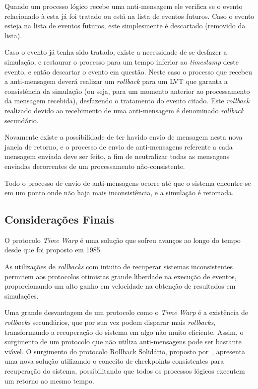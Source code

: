 Quando um processo lógico recebe uma anti-mensagem ele verifica se o evento relacionado à esta já foi tratado ou está na lista de eventos futuros. Caso o evento esteja na lista de eventos futuros, este simplesmente é descartado (removido da lista).

Caso o evento já tenha sido tratado, existe a necessidade de se desfazer a simulação, e restaurar o processo para um tempo inferior ao \textit{timestamp} deste evento, e então descartar o evento em questão. Neste caso o processo que recebeu a anti-mensagem deverá realizar um \textit{rollback} para um LVT que garanta a consistência da simulação (ou seja, para um momento anterior ao processamento da mensagem recebida), desfazendo o tratamento do evento citado. Este \textit{rollback} realizado devido ao recebimento de uma anti-mensagem é denominado \textit{rollback} secundário.

Novamente existe a possibilidade de ter havido envio de mensagem nesta nova janela de retorno, e o processo de envio de anti-mensagens referente a cada mensagem enviada deve ser feito, a fim de neutralizar todas as mensagens enviadas decorrentes de um processamento não-consistente.

Todo o processo de envio de anti-mensagens ocorre até que o sistema encontre-se em um ponto onde não haja mais inconsistência, e a simulação é retomada.

\subsection{Considerações Finais}

O protocolo \textit{Time Warp} é uma solução que sofreu avanços ao longo do tempo desde que foi proposto em 1985. 

As utilizações de \textit{rollbacks} com intuito de recuperar sistemas inconsistentes permitem aos protocolos otimistas grande liberdade na execução de eventos, proporcionando um alto ganho em velocidade na obtenção de resultados em simulações. 

Uma grande desvantagem de um protocolo como o \textit{Time Warp} é a existência de \textit{rollbacks} secundários, que por sua vez podem disparar mais \textit{rollbacks}, transformando a recuperação do sistema em algo não muito eficiente. Assim, o surgimento de um protocolo que não utiliza anti-mensagens pode ser bastante viável. O surgimento do protocolo Rollback Solidário, proposto por~\cite{EDMARMO}, apresenta uma nova solução utilizando o conceito de checkpoints consistentes para recuperação do sistema, possibilitando que todos os processos lógicos executem um retorno ao mesmo tempo.


